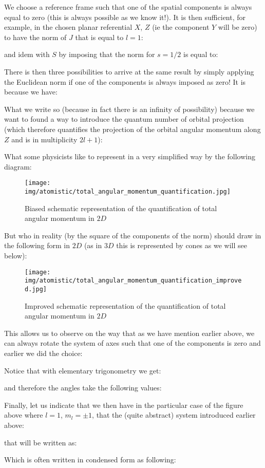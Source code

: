 	We choose a reference frame such that one of the spatial components is always equal to zero (this is always possible as we know it!). It is then sufficient, for example, in the chosen planar referential $X$, $Z$ (ie the component $Y$ will be zero) to have the norm of $J$ that is equal to $l=1$:
	
	and idem with $S$ by imposing that the norm for $s = 1/2$ is equal to:
	
	There is then three possibilities to arrive at the same result by simply applying the Euclidean norm if one of the components is always imposed as zero! It is because we have:
	
	What we write so (because in fact there is an infinity of possibility) because we want to found a way to introduce the quantum number of orbital projection (which therefore quantifies the projection of the orbital angular momentum along $Z$ and is in multiplicity $2l + 1$):
	
	What some physicists like to represent in a very simplified way by the following diagram:
	\begin{figure}[H]
		\centering
		\texttt{[image: img/atomistic/total\_angular\_momentum\_quantification.jpg]}	
		\caption{Biased schematic representation of the quantification of total angular momentum in $2D$}
	\end{figure}
	But who in reality (by the square of the components of the norm) should draw in the following form in $2D$ (as in $3D$ this is represented by cones as we will see below):
	\begin{figure}[H]
		\centering
		\texttt{[image: img/atomistic/total\_angular\_momentum\_quantification\_improved.jpg]}	
		\caption{Improved schematic representation of the quantification of total angular momentum in $2D$}
	\end{figure}
	This allows us to observe on the way that as we have mention earlier above, we can always rotate the system of axes such that one of the components is zero and earlier we did the choice:
	
	Notice that with elementary trigonometry we get:
	
	and therefore the angles take the following values:
	
	Finally, let us indicate that we then have in the particular case of the figure above where $l=1$, $m_l=\pm 1$, that the (quite abstract) system introduced earlier above:
	
	that will be written as:
	
	Which is often written in condensed form as following:
	
